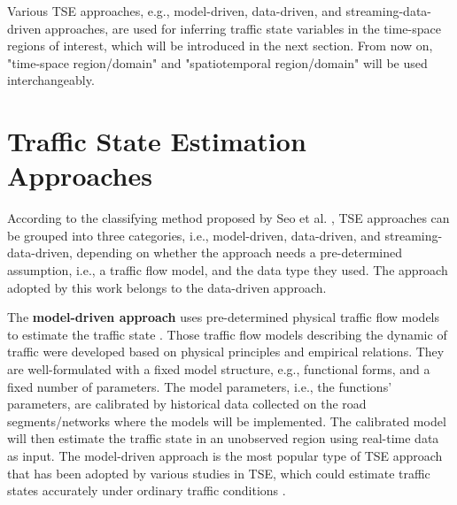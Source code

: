 \documentclass[english]{kththesis}
\begin{document}
Various TSE approaches, e.g., model-driven, data-driven, and streaming-data-driven approaches, are used for inferring traffic state variables in the time-space regions of interest, which will be introduced in the next section. From now on, "time-space region/domain" and "spatiotemporal region/domain" will be used interchangeably.


\section{Traffic State Estimation Approaches}
\label{sec:tseApproaches}
According to the classifying method proposed by Seo et al. \cite{seo_tse}, TSE approaches can be grouped into three categories, i.e., model-driven, data-driven, and streaming-data-driven, depending on whether the approach needs a pre-determined assumption, i.e., a traffic flow model, and the data type they used. The approach adopted by this work belongs to the data-driven approach.

The \textbf{model-driven approach} uses pre-determined physical traffic flow models to estimate the traffic state \cite{seo_tse}. Those traffic flow models describing the dynamic of traffic were developed based on physical principles and empirical relations. They are well-formulated with a fixed model structure, e.g., functional forms, and a fixed number of parameters. The model parameters, i.e., the functions' parameters, are calibrated by historical data collected on the road segments/networks where the models will be implemented. The calibrated model will then estimate the traffic state in an unobserved region using real-time data as input. The model-driven approach is the most popular type of TSE approach that has been adopted by various studies in TSE, which could estimate traffic states accurately under ordinary traffic conditions \cite{seo_tse}.
\end{document}
